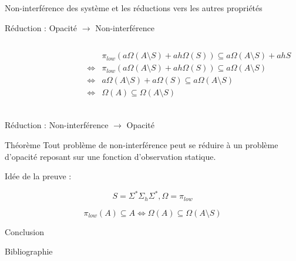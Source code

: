 \documentclass[11pt]{beamer}
\begin{document}
\begin{section}{Non-interf\'erence des syst\`eme et les r\'eductions vers les autres propri\'et\'es}
\begin{frame}{R\'eduction : Opacit\'e $\to$ Non-interf\'erence}
\begin{columns}
\begin{column}{.30\textwidth}
\begin{figure}[H]
\begin{tikzpicture}
  \end{tikzpicture}
\end{figure}
 \end{column}

 \begin{column}{.85\textwidth}
 \begin{flushleft}
$$\begin{array}{ll}
& \pi_{low}(a\Omega(A\setminus S) + a h \Omega(S))\subseteq a\Omega(A\setminus S) + a h S\\
\iff & \pi_{low}(a\Omega(A\setminus S) + a h \Omega(S))\subseteq a\Omega(A\setminus S)\\
\iff & a\Omega(A\setminus S) + a \Omega(S)\subseteq a\Omega(A\setminus S)\\
\iff & \Omega(A) \subseteq \Omega(A\setminus S)\\
\end{array}
$$
\end{flushleft}
 \end{column}
\end{columns}




\end{frame}

\begin{frame}{R\'eduction : Non-interf\'erence $\to$ Opacit\'e}
\begin{beamerlikethm}{Th\'eor\`eme {\cite[page 5]{BryansKMR08}}}
Tout probl\`eme de non-interf\'erence peut se r\'eduire \`a un probl\`eme d'opacit\'e reposant sur une fonction d'observation statique.
\end{beamerlikethm}

Id\'ee de la preuve :

$$S=\Sigma^*\Sigma_h\Sigma^*, \Omega = \pi_{low}$$

$$\pi_{low}(A) \subseteq A \iff \Omega(A) \subseteq \Omega(A \setminus S)$$
\end{frame}

\end{section}


\begin{section}{Conclusion}
 
\end{section}

\begin{frame}{Bibliographie}

\end{frame}
\end{document}
